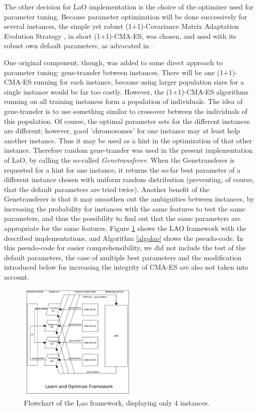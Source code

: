 \documentclass{MYsig-alternate}
\begin{document}
The other decision for LaO implementation is the choice of the optimizer used for parameter tuning. Because parameter optimization will be done successively for several instances, the simple yet robust (1+1)-Covariance Matrix Adaptation Evolution Strategy \cite{hansen2001ecj}, in short (1+1)-CMA-ES,  was chosen, and used with its robust own default parameters, as advocated in \cite{BibGECCO:2010}.

One original component, though, was added to some direct approach to parameter tuning: gene-transfer between instances. There will be one (1+1)-CMA-ES running for each instance, because using larger population sizes for a single instance would be far too costly. However, the (1+1)-CMA-ES algorithms running on all training instances form a population of individuals. The idea of gene-transfer is to use something similar to crossover between the individuals of this population. Of course, the optimal parameter sets for the different instances are different; however, good 'chromosomes' for one instance may at least help another instance. Thus it may be used as a hint in the optimization of that other instance. Therefore random gene-transfer was used in the present implementation of LaO, by calling the so-called {\em Genetransferer}. When the Genetransferer is requested for a hint for one instance, it returns the so-far best parameter of a different instance chosen with uniform random distribution (preventing, of course, that the default parameters are tried twice). Another benefit of the Genetransferer is that it may smoothen out the ambiguities between instances, by increasing the probability for instances with the same features to test the same parameters, and thus the possibility to find out that the same parameters are appropriate for the same features. Figure \ref{figure:laoflowchart} shows the LAO framework with the described implementations, and Algorithm \ref{algolao} shows the pseudo-code. In this pseudo-code for easier comprehensibility, we did not include the test of the default parameters, the case of multiple best parameters and the modification introduced below for increasing the integrity of CMA-ES are also not taken into account. 

\begin{figure}[h!]
  \centering
    \includegraphics[width=0.5\textwidth]{lao.png}
  \caption{Flowchart of the Lao framework, displaying only 4 instances.}
\label{figure:laoflowchart}
\end{figure}
\end{document}
